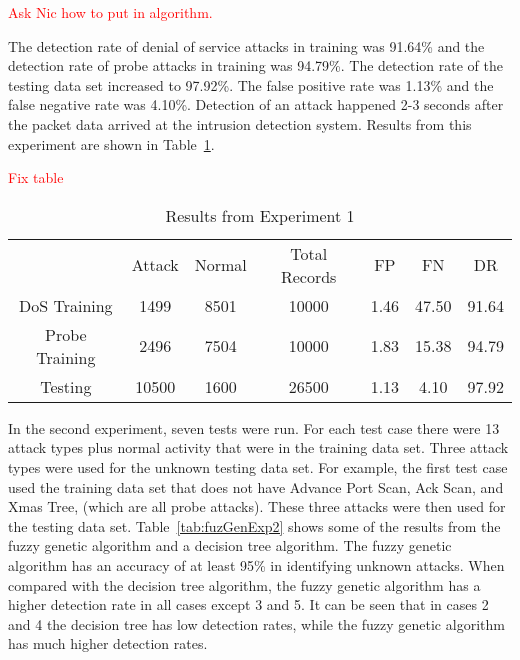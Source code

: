 \documentclass{sig-alternate}
\newcommand{\mycomment}[1]{\textcolor{red}{#1}}
\begin{document}
\mycomment{Ask Nic how to put in algorithm.}

The detection rate of denial of service attacks in training was 91.64\% and the detection rate of probe attacks in training was 94.79\%. The detection rate of the testing data set increased to 97.92\%. The false positive rate was 1.13\% and the false negative rate was 4.10\%. Detection of an attack happened 2-3 seconds after the packet data arrived at the intrusion detection system. Results from this experiment are shown in Table~\ref{tab:fuzGenExp1}.

\mycomment{Fix table}

\begin{table}
\caption{Results from Experiment 1}
\begin{tabular}{|ccccccc|} \hline
 & Attack & Normal & Total Records & FP & FN & DR\\
DoS Training & 1499 & 8501 & 10000 & 1.46 & 47.50 & 91.64\\
Probe Training & 2496 & 7504 & 10000 & 1.83 & 15.38 & 94.79\\
Testing & 10500 & 1600 & 26500 & 1.13 & 4.10 & 97.92\\
\hline\end{tabular}
\label{tab:fuzGenExp1}
\end{table}

In the second experiment, seven tests were run. For each test case there were 13 attack types plus normal activity that were in the training data set. Three attack types were used for the unknown testing data set. For example, the first test case used the training data set that does not have Advance Port Scan, Ack Scan, and Xmas Tree, (which are all probe attacks). These three attacks were then used for the testing data set. Table~\ref{tab:fuzGenExp2} shows some of the results from the fuzzy genetic algorithm and a decision tree algorithm. The fuzzy genetic algorithm has an accuracy of at least 95\% in identifying unknown attacks. When compared with the decision tree algorithm, the fuzzy genetic algorithm has a higher detection rate in all cases except 3 and 5. It can be seen that in cases 2 and 4 the decision tree has low detection rates, while the fuzzy genetic algorithm has much higher detection rates.
\end{document}
